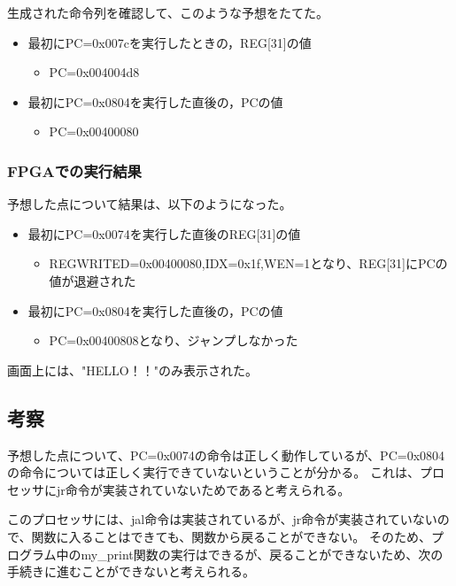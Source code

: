 生成された命令列を確認して、このような予想をたてた。
\begin{itemize}
  \item 最初にPC=0x007cを実行したときの，REG[31]の値
        \begin{itemize}
          \item PC=0x004004d8
        \end{itemize}
  \item 最初にPC=0x0804を実行した直後の，PCの値
        \begin{itemize}
          \item PC=0x00400080
        \end{itemize}
\end{itemize}

\subsubsection{FPGAでの実行結果}
予想した点について結果は、以下のようになった。
\begin{itemize}
  \item 最初にPC=0x0074を実行した直後のREG[31]の値
        \begin{itemize}
          \item REGWRITED=0x00400080,IDX=0x1f,WEN=1となり、REG[31]にPCの値が退避された
        \end{itemize}
  \item 最初にPC=0x0804を実行した直後の，PCの値
        \begin{itemize}
          \item PC=0x00400808となり、ジャンプしなかった
        \end{itemize}
\end{itemize}

画面上には、"HELLO！！"のみ表示された。

\subsection{考察}
予想した点について、PC=0x0074の命令は正しく動作しているが、PC=0x0804の命令については正しく実行できていないということが分かる。
これは、プロセッサにjr命令が実装されていないためであると考えられる。

このプロセッサには、jal命令は実装されているが、jr命令が実装されていないので、関数に入ることはできても、関数から戻ることができない。
そのため、プログラム中のmy\_print関数の実行はできるが、戻ることができないため、次の手続きに進むことができないと考えられる。
